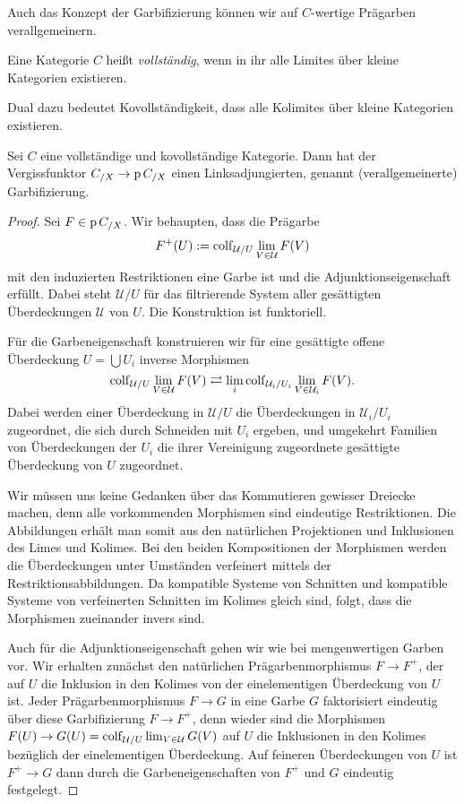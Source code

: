 Auch das Konzept der Garbifizierung können wir auf $C$-wertige
Prägarben verallgemeinern.
\begin{defn}
  Eine Kategorie $C$ heißt \emph{vollständig}, wenn in ihr alle
  Limites über kleine Kategorien existieren.
\end{defn}
Dual dazu bedeutet Kovollständigkeit, dass alle Kolimites über kleine
Kategorien existieren.
\begin{satz}
  Sei $C$ eine vollständige und kovollständige Kategorie. Dann hat der
  Vergissfunktor $C_{/X} \to \operatorname{p} C_{/X}$ einen Linksadjungierten,
  genannt (verallgemeinerte) Garbifizierung.
\end{satz}
\begin{proof}
  Sei $F \in \operatorname{p} C_{/X}$. Wir behaupten, dass die Prägarbe
  \[ F^+(U) :=   \operatorname{colf}_{\mathcal{U}/U} \lim_{V \in \mathcal{U}} F(V) \]
  mit den induzierten Restriktionen eine Garbe ist und die
  Adjunktionseigenschaft erfüllt. Dabei steht $\mathcal{U}/U$ für das
  filtrierende System aller gesättigten Überdeckungen $\mathcal{U}$
  von $U$. Die Konstruktion ist funktoriell.

  Für die Garbeneigenschaft konstruieren wir für eine gesättigte
  offene Überdeckung $U = \bigcup U_i$ inverse Morphismen
  \[ \operatorname{colf}\limits_{\mathcal{U}/U} \lim_{V \in \mathcal{U}} F(V)
  \rightleftarrows
  \lim_i \operatorname{colf}\limits_{\mathcal{U}_i/U_i} \lim_{V \in \mathcal{U}_i} F(V).
  \]
  Dabei werden einer Überdeckung in $\mathcal{U}/U$ die Überdeckungen
  in $\mathcal{U}_i/U_i$ zugeordnet, die sich durch Schneiden mit
  $U_i$ ergeben, und umgekehrt Familien von Überdeckungen der $U_i$
  die ihrer Vereinigung zugeordnete gesättigte Überdeckung von $U$
  zugeordnet.

  Wir müssen uns keine Gedanken über das Kommutieren gewisser Dreiecke
  machen, denn alle vorkommenden Morphismen sind eindeutige
  Restriktionen. Die Abbildungen erhält man somit aus den natürlichen
  Projektionen und Inklusionen des Limes und Kolimes. Bei den beiden
  Kompositionen der Morphismen werden die Überdeckungen unter
  Umständen verfeinert mittels der Restriktionsabbildungen. Da
  kompatible Systeme von Schnitten und kompatible Systeme von
  verfeinerten Schnitten im Kolimes gleich sind, folgt, dass die
  Morphismen zueinander invers sind.
  
  Auch für die Adjunktionseigenschaft gehen wir wie bei mengenwertigen
  Garben vor. Wir erhalten zunächst den natürlichen
  Prägarbenmorphismus $F \to F^+$, der auf $U$ die Inklusion in den
  Kolimes von der einelementigen Überdeckung von $U$ ist. Jeder
  Prägarbenmorphismus $F \to G$ in eine Garbe $G$ faktorisiert
  eindeutig über diese Garbifizierung $F \to F^+$, denn wieder sind
  die Morphismen $F(U) \to G(U) = \operatorname{colf}_{\mathcal{U}/U} \lim_{V \in
    \mathcal{U}} G(V)$ auf $U$ die Inklusionen in den Kolimes
  bezüglich der einelementigen Überdeckung. Auf feineren Überdeckungen
  von $U$ ist $F^+ \to G$ dann durch die Garbeneigenschaften von $F^+$
  und $G$ eindeutig festgelegt.
\end{proof}

